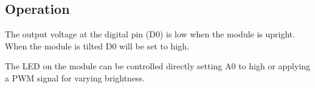 \subsection*{Operation}
The output voltage at the digital pin (D0) is low when the module is upright. When the module is tilted D0 will be set to high.

The LED on the module can be controlled directly setting A0 to high or applying a PWM signal for varying brightness.
%